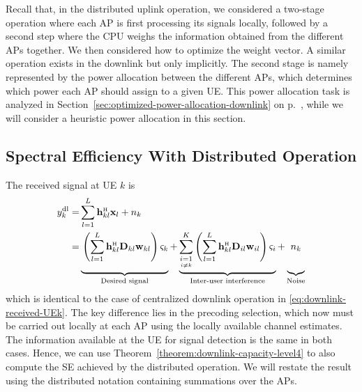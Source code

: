 \enlargethispage{\baselineskip}

Recall that, in the distributed uplink operation, we considered a two-stage operation where each AP is first processing its signals locally, followed by a second step where the CPU weighs the information obtained from the different APs together. We then considered how to optimize the weight vector. A similar operation exists in the downlink but only implicitly. The second stage is namely represented by the power allocation between the different APs, which determines which power each AP should assign to a given UE. This power allocation task is analyzed in Section~\ref{sec:optimized-power-allocation-downlink} on p.~\pageref{sec:optimized-power-allocation-downlink}, while we will consider a heuristic power allocation in this section.

\subsection{Spectral Efficiency With Distributed Operation}
\label{sec:level2-SE-downlink}

The received signal at UE $k$ is
\begin{align} 
y_k^{\rm{dl}} =& \sum_{l=1}^{L}  \vect{h}_{kl}^{\Htran}\vect{x}_l + n_k 
\nonumber \\
=&\underbrace{ \vphantom{\condSum{i=1}{i \neq k}{K}} \left( \sum_{l=1}^{L}  \vect{h}_{kl}^{\Htran}\vect{D}_{kl}  \vect{w}_{kl} \right) \varsigma_k}_{\textrm{Desired signal}}+ \underbrace{\condSum{i=1}{i \neq k}{K} \left( \sum_{l=1}^{L}  \vect{h}_{kl}^{\Htran}\vect{D}_{il}  \vect{w}_{il}   \right) \varsigma_i}_{\textrm{Inter-user interference}} + \underbrace{\vphantom{\condSum{i=1}{i \neq k}{K}} n_k}_{\textrm{Noise}} \label{eq:DCC-downlink-level2}
\end{align}
which is identical to the case of centralized downlink operation in \eqref{eq:downlink-received-UEk}. The key difference lies in the precoding selection, which now must be carried out locally at each AP using the locally available channel estimates. The information available at the UE for signal detection is the same in both cases. Hence, we can use Theorem~\ref{theorem:downlink-capacity-level4} to also compute the SE achieved by the distributed operation. We will restate the result using the distributed notation containing summations over the APs.

